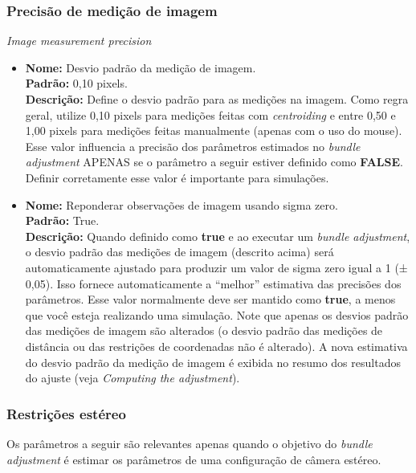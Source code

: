 \documentclass[
  12pt,
  letterpaper,
  DIV=11,
  numbers=noendperiod]{scrreprt}
\begin{document}
\subsubsection{\texorpdfstring{\textbf{Precisão de medição de
imagem}}{Precisão de medição de imagem}}\label{precisuxe3o-de-mediuxe7uxe3o-de-imagem}

\emph{Image measurement precision}

\begin{itemize}
\item
  \textbf{Nome:} Desvio padrão da medição de imagem.\\
  \textbf{Padrão:} 0,10 pixels.\\
  \textbf{Descrição:} Define o desvio padrão para as medições na imagem.
  Como regra geral, utilize 0,10 pixels para medições feitas com
  \emph{centroiding} e entre 0,50 e 1,00 pixels para medições feitas
  manualmente (apenas com o uso do mouse). Esse valor influencia a
  precisão dos parâmetros estimados no \emph{bundle adjustment} APENAS
  se o parâmetro a seguir estiver definido como \textbf{FALSE}. Definir
  corretamente esse valor é importante para simulações.
\item
  \textbf{Nome:} Reponderar observações de imagem usando sigma zero.\\
  \textbf{Padrão:} True.\\
  \textbf{Descrição:} Quando definido como \textbf{true} e ao executar
  um \emph{bundle adjustment}, o desvio padrão das medições de imagem
  (descrito acima) será automaticamente ajustado para produzir um valor
  de sigma zero igual a 1 (± 0,05). Isso fornece automaticamente a
  ``melhor'' estimativa das precisões dos parâmetros. Esse valor
  normalmente deve ser mantido como \textbf{true}, a menos que você
  esteja realizando uma simulação. Note que apenas os desvios padrão das
  medições de imagem são alterados (o desvio padrão das medições de
  distância ou das restrições de coordenadas não é alterado). A nova
  estimativa do desvio padrão da medição de imagem é exibida no resumo
  dos resultados do ajuste (veja \emph{Computing the adjustment}).
\end{itemize}

\subsubsection{Restrições estéreo}\label{restriuxe7uxf5es-estuxe9reo}

Os parâmetros a seguir são relevantes apenas quando o objetivo do
\emph{bundle adjustment} é estimar os parâmetros de uma configuração de
câmera estéreo.
\end{document}
